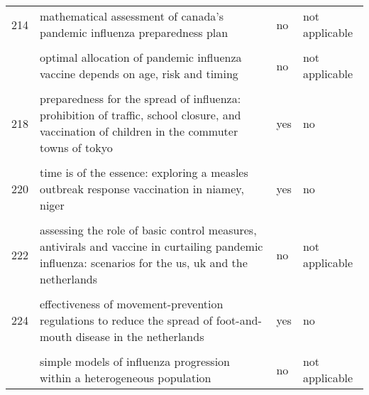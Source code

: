 \documentclass[
]{article}
\begin{document}
\begin{landscape}
\begin{longtable}{l>{\raggedright\arraybackslash}p{9cm}ll}
214 & mathematical assessment of canada's pandemic influenza preparedness plan & no & not applicable\\
\cellcolor{gray!6}{215} & \cellcolor{gray!6}{modeling targeted layered containment of an influenza pandemic in the united states} & \cellcolor{gray!6}{yes} & \cellcolor{gray!6}{yes}\\
\addlinespace
216 & optimal allocation of pandemic influenza vaccine depends on age, risk and timing & no & not applicable\\
\cellcolor{gray!6}{217} & \cellcolor{gray!6}{pandemic simulation of antivirals plus school closures: buying time until strain-specific vaccine is available} & \cellcolor{gray!6}{no} & \cellcolor{gray!6}{not applicable}\\
218 & preparedness for the spread of influenza: prohibition of traffic, school closure, and vaccination of children in the commuter towns of tokyo & yes & no\\
\cellcolor{gray!6}{219} & \cellcolor{gray!6}{scenarios of diffusion and control of an influenza pandemic in italy} & \cellcolor{gray!6}{yes} & \cellcolor{gray!6}{yes}\\
220 & time is of the essence: exploring a measles outbreak response vaccination in niamey, niger & yes & no\\
\addlinespace
\cellcolor{gray!6}{221} & \cellcolor{gray!6}{a stochastic equation-based model of the value of international air-travel restrictions for controlling pandemic flu} & \cellcolor{gray!6}{yes} & \cellcolor{gray!6}{yes}\\
222 & assessing the role of basic control measures, antivirals and vaccine in curtailing pandemic influenza: scenarios for the us, uk and the netherlands & no & not applicable\\
\cellcolor{gray!6}{223} & \cellcolor{gray!6}{deterministic sir (susceptible–infected–removed) models applied to varicella outbreaks} & \cellcolor{gray!6}{yes} & \cellcolor{gray!6}{no}\\
224 & effectiveness of movement-prevention regulations to reduce the spread of foot-and-mouth disease in the netherlands & yes & no\\
\cellcolor{gray!6}{225} & \cellcolor{gray!6}{effects of internal border control on spread of pandemic influenza} & \cellcolor{gray!6}{yes} & \cellcolor{gray!6}{yes}\\
\addlinespace
226 & simple models of influenza progression within a heterogeneous population & no & not applicable\\

\end{longtable}
\end{landscape}
\end{document}
